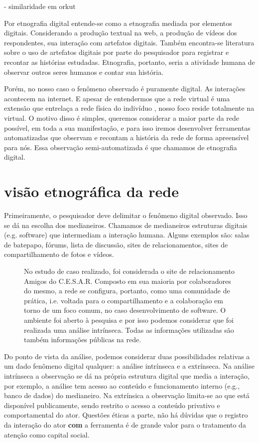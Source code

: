 \documentclass{article}
\begin{document}
\cite{Spertus2005} - similaridade em orkut


Por etnografia digital entende-se como a etnografia mediada por elementos
digitais. Considerando a produção textual na web, a produção de vídeos dos
respondentes, sua interação com artefatos digitais. Também encontra-se
literatura sobre o uso de artefatos digitais por parte do pesquisador para
registrar e recontar as histórias estudadas. Etnografia, portanto, seria a
atividade humana de observar outros seres humanos e contar sua história. 

Porém, no nosso caso o fenômeno observado é puramente digital. As interações
acontecem na internet. E apesar de entendermos que a rede virtual é uma extensão
que entrelaça a rede física do indivíduo \cite{Haythornthwaite2005}, nosso foco
reside totalmente na virtual. O motivo disso é simples, queremos considerar a maior parte da rede
possível, em toda a sua manifestação, e para isso iremos desenvolver ferramentas
automatizadas que observam e recontam a história da rede de forma apreensível
para nós. Essa observação semi-automatizada é que chamamos de etnografia
digital.

\section{visão etnográfica da rede}

Primeiramente, o pesquisador deve delimitar o fenômeno digital observado. Isso
se dá na escolha dos medianeiros. Chamamos de medianeiros estruturas digitais
(e.g. software) que intermediam a interação humana. Alguns exemplos são: salas
de batepapo, fórums, lista de discussão, sites de relacionamentos, sites de
compartilhamento de fotos e vídeos.

\begin{figure}
\begin{boxedminipage}{2in}
No estudo de caso realizado, foi considerada o site de relacionamento Amigos do
C.E.S.A.R. Composto em sua maioria por colaboradores do mesmo, a rede se
configura, portanto, como uma comunidade de prática, i.e. voltada para o
compartilhamento e a colaboração em torno de um foco comum, no caso
desenvolvimento de software. O ambiente foi aberto à pesquisa e por isso podemos
considerar que foi realizada uma análise intrínseca. Todas as informações
utilizadas são também informações públicas na rede.
\end{boxedminipage}
\end{figure}
Do ponto de vista da análise, podemos considerar duas possibilidades relativas a
um dado fenômeno digital qualquer: a análise intrínseca e a extrínseca. Na
análise intrínseca a observação se dá na própria estrutura digital que media a
interação, por exemplo, a análise tem acesso ao conteúdo e funcionamento
interno (e.g., banco de dados) do medianeiro. Na extrínsica a observação
limita-se ao que está disponível publicamente, sendo restrito o acesso a
conteúdo privativo e comportamental do ator. Questões éticas a parte, não há
dúvidas que o registro da interação do ator \textbf{com} a ferramenta é de
grande valor para o tratamento da atenção como capital social.
\end{document}
